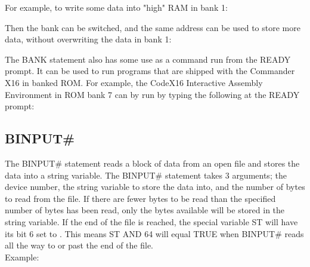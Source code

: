 For example, to write some data into "high" RAM in bank 1:\\


Then the bank can be switched, and the same address can be used to store more
data, without overwriting the data in bank 1:\\


The {\ttfamily BANK} statement also has some use as a command run from the
{\ttfamily READY} prompt.  It can be used to run programs that are shipped with
the Commander X16 in banked ROM.  For example, the CodeX16 Interactive Assembly
Environment in ROM bank 7 can by run by typing the following at the {\ttfamily
READY} prompt:\\


\subsection{BINPUT\#}

 The {\ttfamily BINPUT\#} statement reads a block of data from an open file and
 stores the data into a string variable.  The {\ttfamily BINPUT\#} statement
 takes 3 arguments; the device number, the string variable to store the data
 into, and the number of bytes to read from the file.  If there are fewer bytes
 to be read than the specified number of bytes has been read, only the bytes
 available will be stored in the string variable.  If the end of the file is
 reached, the special variable {\ttfamily ST} will have its bit 6 set to
 {}.  This means {\ttfamily ST AND 64} will equal {\ttfamily TRUE}
 when {\ttfamily BINPUT\#} reads all the way to or past the end of the file.\\

 Example:\\


